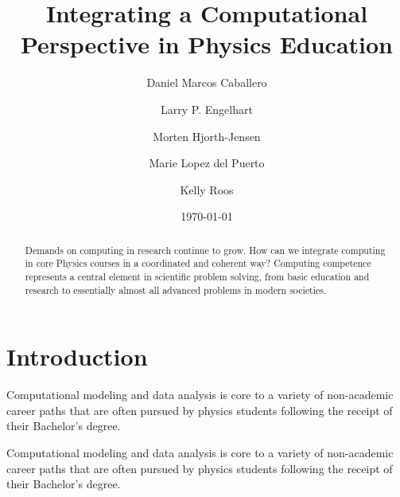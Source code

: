 \documentclass[reprint,floatfix]{revtex4-1}
\begin{document}
\title{Integrating a Computational Perspective in Physics Education}

\author{Daniel Marcos Caballero}
\author{Larry P. Engelhart}
\author{Morten Hjorth-Jensen}
\author{Marie Lopez del Puerto}
\author{Kelly Roos}




\date{\today}




\begin{abstract}

Demands on computing in research continue to grow.  How can we
integrate computing in core Physics courses in a coordinated and
coherent way?  
Computing competence represents a central element in
scientific problem solving, from basic education and research to
essentially almost all advanced problems in modern societies.  

\end{abstract}

\maketitle

\section{Introduction}


Computational modeling and data analysis is core to a variety of
non-academic career paths that are often pursued by physics students
following the receipt of their Bachelor's degree.


Computational modeling and data analysis is core to a variety of
non-academic career paths that are often pursued by physics students
following the receipt of their Bachelor's degree.
\end{document}
